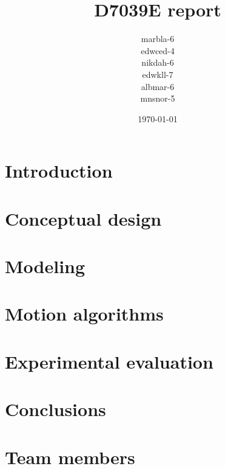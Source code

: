 \documentclass{report}
\title{D7039E report}
\author{marbla-6 \\
        edwced-4 \\
        nikdah-6 \\
        edwkll-7 \\
        albmar-6 \\
        mnsnor-5 \\
        }
\date{\today}
\begin{document}
\maketitle
\begin{abstract}
\end{abstract}

\chapter*{Introduction}


\chapter*{Conceptual design}


\chapter*{Modeling}


\chapter*{Motion algorithms}


\chapter*{Experimental evaluation}


\chapter*{Conclusions}


\appendix
\chapter{Team members}

\end{document}
